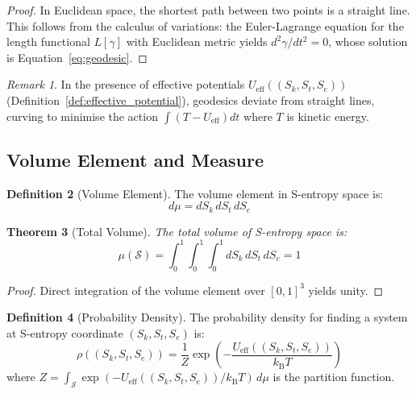 \documentclass[11pt,twocolumn,a4paper]{article}
\newtheorem{theorem}{Theorem}[section]
\theoremstyle{definition}
\newtheorem{definition}[theorem]{Definition}
\theoremstyle{remark}
\newtheorem{remark}[theorem]{Remark}
\newcommand{\kB}{k_{\mathrm{B}}}
\newcommand{\Sspace}{\mathcal{S}}
\newcommand{\Scoord}{(\Sk,\St,\Se)}
\newcommand{\Sk}{S_k}
\newcommand{\St}{S_t}
\newcommand{\Se}{S_e}
\begin{document}
\begin{proof}
In Euclidean space, the shortest path between two points is a straight line. This follows from the calculus of variations: the Euler-Lagrange equation for the length functional $L[\gamma]$ with Euclidean metric yields $d^2\gamma/dt^2 = 0$, whose solution is Equation~\eqref{eq:geodesic}.
\end{proof}

\begin{remark}
In the presence of effective potentials $U_{\mathrm{eff}}(\Scoord)$ (Definition~\ref{def:effective_potential}), geodesics deviate from straight lines, curving to minimise the action $\int (T - U_{\mathrm{eff}}) dt$ where $T$ is kinetic energy.
\end{remark}

\subsection{Volume Element and Measure}

\begin{definition}[Volume Element]
\label{def:volume_element}
The volume element in S-entropy space is:
\begin{equation}
d\mu = d\Sk \, d\St \, d\Se
\label{eq:volume_element}
\end{equation}
\end{definition}

\begin{theorem}[Total Volume]
\label{thm:total_volume}
The total volume of S-entropy space is:
\begin{equation}
\mu(\Sspace) = \int_0^1 \int_0^1 \int_0^1 d\Sk \, d\St \, d\Se = 1
\label{eq:total_volume}
\end{equation}
\end{theorem}

\begin{proof}
Direct integration of the volume element over $[0,1]^3$ yields unity.
\end{proof}

\begin{definition}[Probability Density]
\label{def:probability_density}
The probability density for finding a system at S-entropy coordinate $\Scoord$ is:
\begin{equation}
\rho(\Scoord) = \frac{1}{Z} \exp\left(-\frac{U_{\mathrm{eff}}(\Scoord)}{\kB T}\right)
\label{eq:probability_density}
\end{equation}
where $Z = \int_{\Sspace} \exp(-U_{\mathrm{eff}}(\Scoord)/\kB T) \, d\mu$ is the partition function.
\end{definition}
\end{document}
